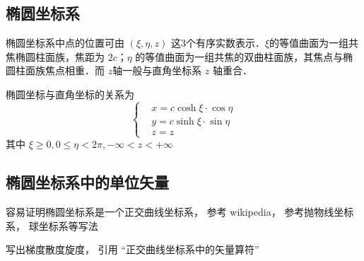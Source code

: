 \begin{issues}
\issueDraft
\end{issues}
\subsection{椭圆坐标系}
椭圆坐标系中点的位置可由 $(\xi,\eta,z)$ 这3个有序实数表示．$\xi$的等值曲面为一组共焦椭圆柱面族，焦距为 $2c$；$\eta$ 的等值曲面为一组共焦的双曲柱面族，其焦点与椭圆柱面族焦点相重．而 $z$轴一般与直角坐标系 $z$ 轴重合．

椭圆坐标与直角坐标的关系为
\begin{equation}
\left\{\begin{aligned}
&x=c\cosh\xi\cdot\cos\eta\\
&y=c\sinh\xi\cdot\sin\eta\\
&z=z
\end{aligned}\right.
\end{equation}
其中 $\xi\geq0,0\leq\eta<2\pi,-\infty<z<+\infty$
\subsection{椭圆坐标系中的单位矢量}
容易证明椭圆坐标系是一个正交曲线坐标系，
参考 wikipedia， 参考抛物线坐标系， 球坐标系等写法

写出梯度散度旋度， 引用 “正交曲线坐标系中的矢量算符”
